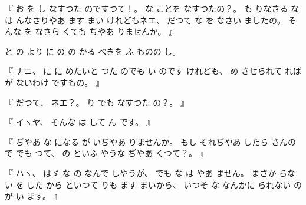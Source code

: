 %
『
お
を
し
なすつた
のですつて！。
%
な
ことを
なすつたの？。
%
も
りなさる
な
は
んなさりやあ
ます
まい
けれどもネエ、
%
だつて
な
を
なさい
ましたの。
%
そんな
を
なさら
くても
ぢやあ
りませんか。
』

%
と
の
より
に
の
の
かる
べきを
ふ
ものの
し。

%
『
ナニ、
%
に
に
めたいと
つた
のでも
い
のです
けれども、
%
め
させられて
れば
が
ないわけ
ですもの。
』

%
『
だつて、
%
ネエ？。
%
り
でも
なすつた
の？。
』

%
『
イヽヤ、
%
そんな
は
して
ん
です。
』

%
『
ぢやあ
な
になる
が
いぢやあ
りませんか。
%
もし
それぢやあ
したら
さんの
で
でも
つて、
%
の
といふ
やうな
ぢやあ
くつて？。
』

%
『
ハヽ、
%
はゞ
な
の
なんで
しやうが、
%
でも
な
は
やあ
ません。
%
まさか
らない
を
した
から
といつて
りも
ます
まいから、
%
いつそ
な
なんかに
られない
の
が
い
ます。
』

